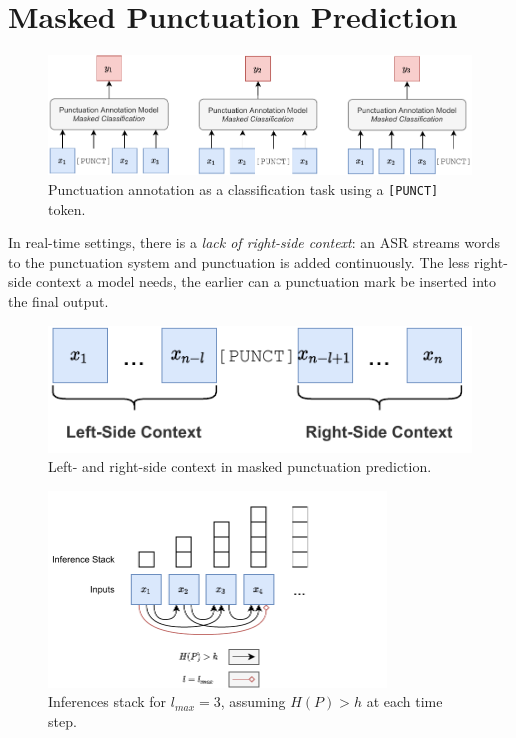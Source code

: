 \documentclass[bsc,deptreport,ai]{infthesis} %
\begin{document}
\section{Masked Punctuation Prediction}
\label{sec:modelsetup}
\begin{figure}[!htbp]
\centering
\includegraphics[width=\textwidth]{maskedpunct.pdf}
\caption{Punctuation annotation as a classification task using a \texttt{[PUNCT]} token.}
\label{fig:maskedpunct}
\end{figure}
In real-time settings, there is a \emph{lack of right-side context}: an ASR streams words to the punctuation system and punctuation is added continuously. The less right-side context a model needs, the earlier can a punctuation mark be inserted into the final output.
\begin{figure}[h]
\centering
\includegraphics[width=.5\textwidth]{rightleft(1).pdf}
\caption{Left- and right-side context in masked punctuation prediction.}
\label{fig:rightleft}
\end{figure}
\begin{figure}[h]
\centering
\includegraphics[width=0.8\textwidth]{inferencestack.pdf}
\caption{Inferences stack for $l_{max}=3$, assuming $H(P)>h$ at each time step.}
\label{fig:infstack}
\end{figure}
\end{document}
